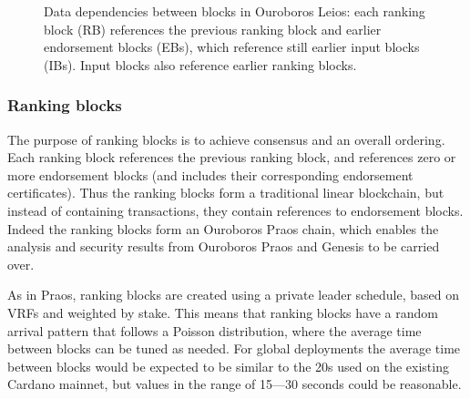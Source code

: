 \documentclass[11pt,a4paper]{article}
\begin{document}
\begin{figure}
\begin{center}
\end{center}
\caption{Data dependencies between blocks in Ouroboros Leios: each ranking block
(RB) references the previous ranking block and earlier endorsement blocks (EBs), which
reference still earlier input blocks (IBs). Input blocks also reference earlier
ranking blocks.}
\label{fig:leios-concurrent-blockchain}
\end{figure}

\subsubsection{Ranking blocks}
The purpose of ranking blocks is to achieve
consensus and an overall ordering. Each ranking block references the previous
ranking block, and references zero or more endorsement blocks (and includes
their corresponding endorsement certificates). Thus the ranking blocks form a
traditional linear blockchain, but instead of containing transactions, they
contain references to endorsement blocks. Indeed the ranking blocks form an
Ouroboros Praos chain, which enables the analysis and security results from
Ouroboros Praos and Genesis to be carried over.

As in Praos, ranking blocks are created using a private leader schedule, based
on VRFs and weighted by stake. This means that ranking blocks have a random
arrival pattern that follows a Poisson distribution, where the average time
between blocks can be tuned as needed. For global deployments the average time
between blocks would be expected to be similar to the 20s used on the existing
Cardano mainnet, but values in the range of 15---30 seconds could be
reasonable.
\end{document}
